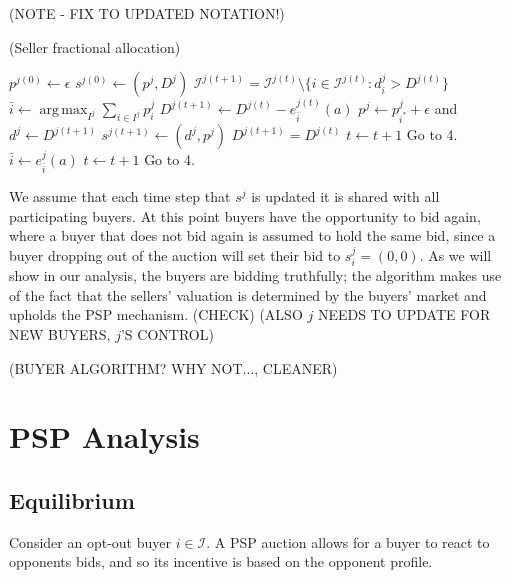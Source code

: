 \documentclass[12pt]{article}
\theoremstyle{definition}
\newcommand{\mcI}{\mathcal{I}}
\DeclareMathOperator*{\argmax}{arg\,max}
\begin{document}
\begin{multicols}{2}
(NOTE - FIX TO UPDATED NOTATION!)
\begin{algorithm}[H]
\caption{(Seller fractional allocation)}
\begin{algorithmic}[1]
\State $p^{j(0)} \gets \epsilon$
\State $s^{j(0)} \gets (p^j, D^j)$
\State $\mcI^{j(t+1)} = \mcI^{j(t)}\setminus \lbrace i \in \mcI^{j(t)}: d_i^j >
D^{j(t)}\rbrace$
\State $ \bar{i} \gets \displaystyle\argmax_{I^j}\sum_{i\in I^j} p_i^j$ 
\State $D^{j(t+1)} \gets D^{j(t)} - e_{\bar{i}}^{j(t)}(a)$
\State $p^j \gets p_{i^*}^j+\epsilon$ and $d^j \gets D^{j(t+1)}$
\State $s^{j(t+1)} \gets (d^j, p^j)$
\State $D^{j(t+1)} = D^{j(t)}$
\State $t \gets t+1$
\State Go to 4.
\Else
\State $\bar{i} \gets e_{\bar{i}}^j(a)$
\State $t \gets t+1$
\State Go to 4.
\EndIf
\EndWhile
\end{algorithmic}
\end{algorithm}
We assume that each time step that $s^j$ is updated it is shared with all
participating buyers. At this point buyers have the opportunity to bid again,
where a buyer that does not bid again is assumed to hold the same bid, since a
buyer dropping out of the auction will set their bid to $s_i^j=(0,0)$. As we will show in our analysis, the buyers are bidding truthfully; the
algorithm makes use of the fact that the sellers' valuation is determined by
the buyers' market and upholds the PSP mechanism. (CHECK) (ALSO $j$ NEEDS TO
UPDATE FOR NEW BUYERS, $j$'S CONTROL)

(BUYER ALGORITHM? WHY NOT..., CLEANER)

\section{PSP Analysis}\label{analysis}
\subsection{Equilibrium}

Consider an opt-out buyer $i\in\mcI$. A PSP auction
allows for a buyer to react to opponents bids, and so its incentive is based on
the opponent profile.


\end{multicols}
\end{document}
